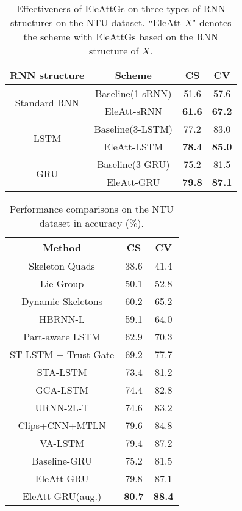 \documentclass[runningheads]{llncs}
\newcommand{\EleAttGn}{{EleAttG}}
\begin{document}
\setlength{\tabcolsep}{7pt}
\begin{table}[t] \centering
\caption{Effectiveness of {\EleAttGn}s on three types of RNN structures on the NTU dataset. ``EleAtt-$X$" denotes the scheme with {\EleAttGn}s based on the RNN structure of $X$.}
	\label{tab:Extend}
	\begin{tabular}{cccc}
		\toprule
		RNN structure                    & Scheme     & CS & CV \\
		\midrule
		\multirow{2}{*}{Standard RNN} & Baseline(1-sRNN)   & 51.6    & 57.6 \\
		& EleAtt-sRNN & \textbf{61.6}     & \textbf{67.2}  \\
		\midrule
		\multirow{2}{*}{LSTM}      & Baseline(3-LSTM)   & 77.2     & 83.0  \\
		& EleAtt-LSTM     & \textbf{78.4}     & \textbf{85.0}  \\
		\midrule
		\multirow{2}{*}{GRU}       & Baseline(3-GRU)   & 75.2     & 81.5  \\
		& EleAtt-GRU       & \textbf{79.8}     & \textbf{87.1} 							\\
		\bottomrule	
	\end{tabular}
\end{table}

\setlength{\tabcolsep}{7pt}
\begin{table}[t] \centering
\caption{Performance comparisons on the NTU dataset in accuracy (\%).}
	\label{tab:ntu}
	\begin{tabular}{ccc}
		\toprule
		{Method}                                           & CS & CV \\
		\midrule
		{Skeleton Quads \cite{evangelidis2014skeletal}}  & 38.6     & 41.4  \\
		{Lie Group \cite{vemulapalli2014human}}          & 50.1     & 52.8  \\
		{Dynamic Skeletons  \cite{hu2015jointly}}        & 60.2    & 65.2  \\
		{HBRNN-L  \cite{du2015hierarchical}}             & 59.1     & 64.0  \\
		{Part-aware LSTM   \cite{Shahroudy_2016_CVPR}} & 62.9     & 70.3  \\
		{ST-LSTM + Trust Gate \cite{liu2016spatio}}      & 69.2     & 77.7  \\
		{STA-LSTM \cite{song2017end}}                    & 73.4     & 81.2  \\
		{GCA-LSTM \cite{liu2017global}}                  & 74.4     & 82.8  \\
		{URNN-2L-T \cite{li2017adaptive}}                & 74.6     & 83.2  \\
		{Clips+CNN+MTLN \cite{ke2017new}}                & 79.6     & 84.8  \\
		{VA-LSTM \cite{zhang2017view}}                   & 79.4     & 87.2  \\
		\midrule
		Baseline-GRU  & 75.2 & 81.5 \\
		EleAtt-GRU & 79.8  & 87.1 \\
		EleAtt-GRU(aug.)     & \textbf{80.7}    & \textbf{88.4} \\
		\bottomrule
	\end{tabular}
\end{table}
\end{document}
